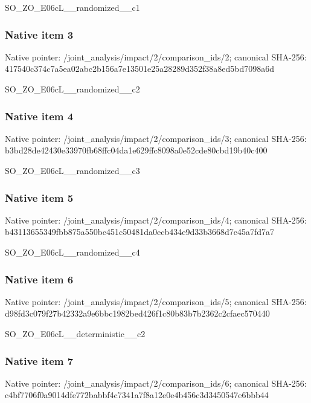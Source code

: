\documentclass[10pt,a4paper]{article}
\begin{document}
SO\_ZO\_E06cL\_\_randomized\_\_c1


\subsubsection{Native item 3}


Native pointer: /joint\_analysis/impact/2\allowbreak{}/comparison\_ids/2; canonical SHA-256: 417540c374c7a5ea02abc2b1\allowbreak{}56a7e13501e25a28289d352f\allowbreak{}38a8ed5bd7098a6d


SO\_ZO\_E06cL\_\_randomized\_\_c2


\subsubsection{Native item 4}


Native pointer: /joint\_analysis/impact/2\allowbreak{}/comparison\_ids/3; canonical SHA-256: b3bd28de42430e33970fb68f\allowbreak{}fc04da1e629ffc8098a0e52c\allowbreak{}de80cbd19b40c400


SO\_ZO\_E06cL\_\_randomized\_\_c3


\subsubsection{Native item 5}


Native pointer: /joint\_analysis/impact/2\allowbreak{}/comparison\_ids/4; canonical SHA-256: b43113655349fbb875a550bc\allowbreak{}451c50481da0ecb434e9d33b\allowbreak{}3668d7e45a7fd7a7


SO\_ZO\_E06cL\_\_randomized\_\_c4


\subsubsection{Native item 6}


Native pointer: /joint\_analysis/impact/2\allowbreak{}/comparison\_ids/5; canonical SHA-256: d98fd3c079f27b42332a9e6b\allowbreak{}bc1982bed426f1c80b83b7b2\allowbreak{}362c2cfaec570440


SO\_ZO\_E06cL\_\_deterministic\_\_c2


\subsubsection{Native item 7}


Native pointer: /joint\_analysis/impact/2\allowbreak{}/comparison\_ids/6; canonical SHA-256: c4bf7706f0a9014dfe772bab\allowbreak{}bf4c7341a7f8a12e0e4b456c\allowbreak{}3d3450547e6bbb44
\end{document}
